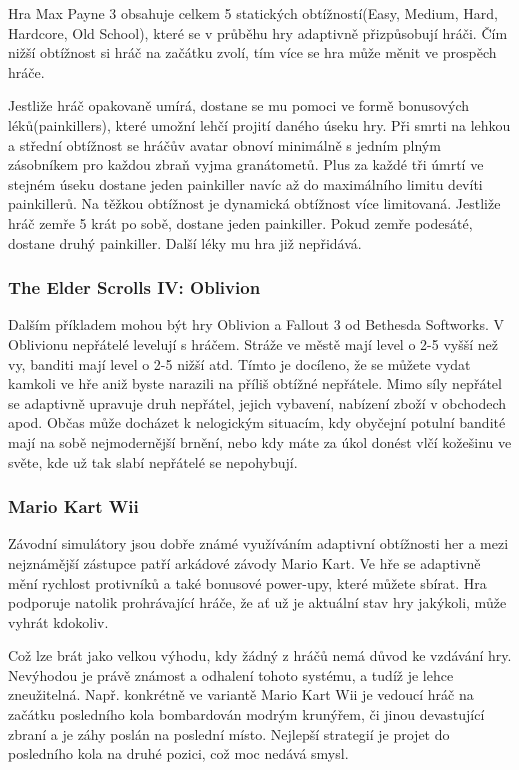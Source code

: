 Hra Max Payne 3 obsahuje celkem 5 statických obtížností(Easy, Medium, Hard, Hardcore, Old School), které se v průběhu hry adaptivně přizpůsobují hráči. Čím nižší obtížnost si hráč na začátku zvolí, tím více se hra může měnit ve prospěch hráče.

Jestliže hráč opakovaně umírá, dostane se mu pomoci ve formě bonusových léků(painkillers), které umožní lehčí projití daného úseku hry. Při smrti na lehkou a střední obtížnost se hráčův avatar obnoví minimálně s jedním plným zásobníkem pro každou zbraň vyjma granátometů. Plus za každé tři úmrtí ve stejném úseku dostane jeden painkiller navíc až do maximálního limitu devíti painkillerů.
Na těžkou obtížnost je dynamická obtížnost více limitovaná. Jestliže hráč zemře 5 krát po sobě, dostane jeden painkiller. Pokud zemře podesáté, dostane druhý painkiller. Další léky mu hra již nepřidává. \cite{3}

\subsubsection{The Elder Scrolls IV: Oblivion}

Dalším příkladem mohou být hry Oblivion a Fallout 3 od Bethesda Softworks. V Oblivionu nepřátelé levelují s hráčem. Stráže ve městě mají level o 2-5 vyšší než vy, banditi mají level o 2-5 nižší atd. Tímto je docíleno, že se můžete vydat kamkoli ve hře aniž byste narazili na příliš obtížné nepřátele. Mimo síly nepřátel se adaptivně upravuje druh nepřátel, jejich vybavení, nabízení zboží v obchodech apod. Občas může docházet k nelogickým situacím, kdy obyčejní potulní bandité mají na sobě nejmodernější brnění, nebo kdy máte za úkol donést vlčí kožešinu ve světe, kde už tak slabí nepřátelé se nepohybují. \cite{4}

\subsubsection{Mario Kart Wii}

Závodní simulátory jsou dobře známé využíváním adaptivní obtížnosti her a mezi nejznámější zástupce patří arkádové závody Mario Kart. Ve hře se adaptivně mění rychlost protivníků a také bonusové power-upy, které můžete sbírat. Hra podporuje natolik prohrávající hráče, že ať už je aktuální stav hry jakýkoli, může vyhrát kdokoliv.

Což lze brát jako velkou výhodu, kdy žádný z hráčů nemá důvod ke vzdávání hry. Nevýhodou je právě známost a odhalení tohoto systému, a tudíž je lehce zneužitelná. Např. konkrétně ve variantě Mario Kart Wii je vedoucí hráč na začátku posledního kola bombardován modrým krunýřem, či jinou devastující zbraní a je záhy poslán na poslední místo. Nejlepší strategií je projet do posledního kola na druhé pozici, což moc nedává smysl. \cite{5}

